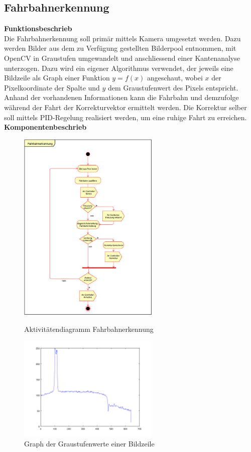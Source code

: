 \subsection{Fahrbahnerkennung}
\textbf{Funktionsbeschrieb}\\
Die Fahrbahnerkennung soll primär mittels Kamera umgesetzt werden. Dazu werden Bilder aus dem zu Verfügung gestellten Bilderpool entnommen, mit OpenCV in Graustufen umgewandelt und anschliessend einer Kantenanalyse unterzogen. Dazu wird ein eigener Algorithmus verwendet, der jeweils eine Bildzeile als Graph einer Funktion $y = f(x)$ angeschaut, wobei $x$ der Pixelkoordinate der Spalte und $y$ dem Graustufenwert des Pixels entspricht.\\
Anhand der vorhandenen Informationen kann die Fahrbahn und demzufolge während der Fahrt der Korrekturvektor ermittelt werden. Die Korrektur selber soll mittels PID-Regelung realisiert werden, um eine ruhige Fahrt zu erreichen.\\
\textbf{Komponentenbeschrieb}
\begin{figure}[h!]%
\centering
\includegraphics[width=0.6\textwidth]{03_Loesungskonzept/pictures/Fahrbahnerkennung.png}
\caption{Aktivitätendiagramm Fahrbahnerkennung}
\includegraphics[width=0.6\textwidth]{03_Loesungskonzept/pictures/graphPicture.png}
\caption{Graph der Graustufenwerte einer Bildzeile}
\label{fig:grayscale}
\end{figure}\\
